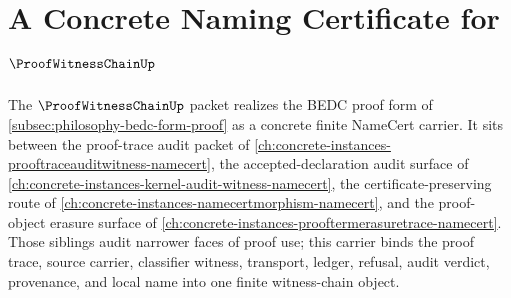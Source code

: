\chapter{A Concrete Naming Certificate for $\ProofWitnessChainUp$}
\label{ch:concrete-instances-proofwitnesschain-namecert}

The $\ProofWitnessChainUp$ packet realizes the BEDC proof form of \autoref{subsec:philosophy-bedc-form-proof} as a concrete finite NameCert carrier. It sits between the proof-trace audit packet of \autoref{ch:concrete-instances-prooftraceauditwitness-namecert}, the accepted-declaration audit surface of \autoref{ch:concrete-instances-kernel-audit-witness-namecert}, the certificate-preserving route of \autoref{ch:concrete-instances-namecertmorphism-namecert}, and the proof-object erasure surface of \autoref{ch:concrete-instances-prooftermerasuretrace-namecert}. Those siblings audit narrower faces of proof use; this carrier binds the proof trace, source carrier, classifier witness, transport, ledger, refusal, audit verdict, provenance, and local name into one finite witness-chain object.

